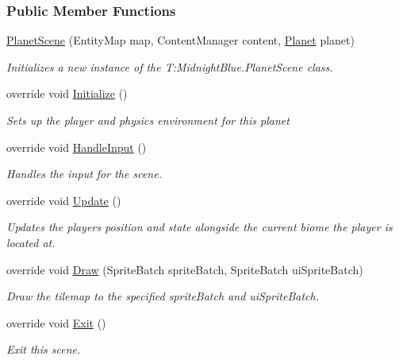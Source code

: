 \subsubsection*{Public Member Functions}
\begin{DoxyCompactItemize}
\item 
\hyperlink{class_midnight_blue_1_1_planet_scene_a50ee691836116a89ff549e519f895ba3}{Planet\+Scene} (Entity\+Map map, Content\+Manager content, \hyperlink{class_midnight_blue_1_1_planet}{Planet} planet)
\begin{DoxyCompactList}\small\item\em Initializes a new instance of the T\+:\+Midnight\+Blue.\+Planet\+Scene class. \end{DoxyCompactList}\item 
override void \hyperlink{class_midnight_blue_1_1_planet_scene_ac8b7e88283b22b87aa45f116b549e86f}{Initialize} ()
\begin{DoxyCompactList}\small\item\em Sets up the player and physics environment for this planet \end{DoxyCompactList}\item 
override void \hyperlink{class_midnight_blue_1_1_planet_scene_a6c84a639f27b9f7510b514969d47d1bd}{Handle\+Input} ()
\begin{DoxyCompactList}\small\item\em Handles the input for the scene. \end{DoxyCompactList}\item 
override void \hyperlink{class_midnight_blue_1_1_planet_scene_add0a85b4f754f026231aa7269259c65c}{Update} ()
\begin{DoxyCompactList}\small\item\em Updates the players position and state alongside the current biome the player is located at. \end{DoxyCompactList}\item 
override void \hyperlink{class_midnight_blue_1_1_planet_scene_af22a201631e5f8c606ec3f7463635977}{Draw} (Sprite\+Batch sprite\+Batch, Sprite\+Batch ui\+Sprite\+Batch)
\begin{DoxyCompactList}\small\item\em Draw the tilemap to the specified sprite\+Batch and ui\+Sprite\+Batch. \end{DoxyCompactList}\item 
override void \hyperlink{class_midnight_blue_1_1_planet_scene_af3aab90a13294493e1f2cd29b0fb60e6}{Exit} ()
\begin{DoxyCompactList}\small\item\em Exit this scene. \end{DoxyCompactList}\item 

\end{DoxyCompactItemize}
